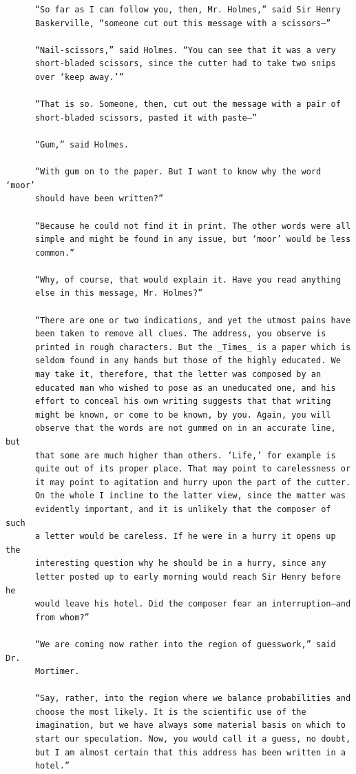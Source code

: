 \documentclass{article}
\begin{document}
\begin{verbatim}
      “So far as I can follow you, then, Mr. Holmes,” said Sir Henry
      Baskerville, “someone cut out this message with a scissors—”

      “Nail-scissors,” said Holmes. “You can see that it was a very
      short-bladed scissors, since the cutter had to take two snips
      over ‘keep away.’”

      “That is so. Someone, then, cut out the message with a pair of
      short-bladed scissors, pasted it with paste—”

      “Gum,” said Holmes.

      “With gum on to the paper. But I want to know why the word ‘moor’
      should have been written?”

      “Because he could not find it in print. The other words were all
      simple and might be found in any issue, but ‘moor’ would be less
      common.”

      “Why, of course, that would explain it. Have you read anything
      else in this message, Mr. Holmes?”

      “There are one or two indications, and yet the utmost pains have
      been taken to remove all clues. The address, you observe is
      printed in rough characters. But the _Times_ is a paper which is
      seldom found in any hands but those of the highly educated. We
      may take it, therefore, that the letter was composed by an
      educated man who wished to pose as an uneducated one, and his
      effort to conceal his own writing suggests that that writing
      might be known, or come to be known, by you. Again, you will
      observe that the words are not gummed on in an accurate line, but
      that some are much higher than others. ‘Life,’ for example is
      quite out of its proper place. That may point to carelessness or
      it may point to agitation and hurry upon the part of the cutter.
      On the whole I incline to the latter view, since the matter was
      evidently important, and it is unlikely that the composer of such
      a letter would be careless. If he were in a hurry it opens up the
      interesting question why he should be in a hurry, since any
      letter posted up to early morning would reach Sir Henry before he
      would leave his hotel. Did the composer fear an interruption—and
      from whom?”

      “We are coming now rather into the region of guesswork,” said Dr.
      Mortimer.

      “Say, rather, into the region where we balance probabilities and
      choose the most likely. It is the scientific use of the
      imagination, but we have always some material basis on which to
      start our speculation. Now, you would call it a guess, no doubt,
      but I am almost certain that this address has been written in a
      hotel.”


\end{verbatim}
\end{document}

